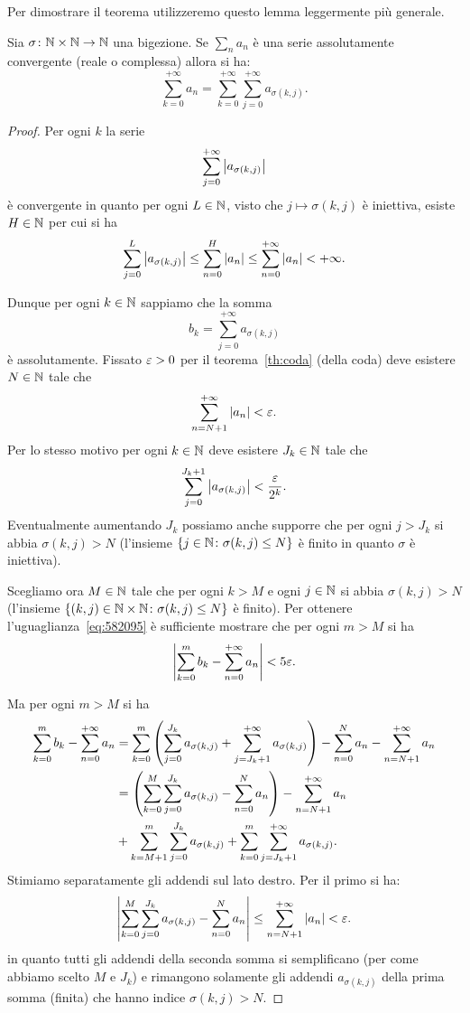 Per dimostrare il teorema utilizzeremo questo
lemma leggermente più generale.

\begin{lemma}
Sia $\sigma\colon \mathbb N\times\mathbb N\to \mathbb N$ una bigezione.
Se $\displaystyle\sum_n a_n$ è una serie
assolutamente convergente  (reale o complessa) allora si ha:
\begin{equation}\label{eq:582095}
  \sum_{k=0}^{+\infty} a_n
  = \sum_{k=0}^{+\infty} \sum_{j=0}^{+\infty} a_{\sigma(k,j)}.
\end{equation}
\end{lemma}
%
%
\begin{proof}
Per ogni $k$ la serie
\[
  \sum_{j=0}^{+\infty} {\left|a_{\sigma(k,j)}\right|}
\]
è convergente in quanto per ogni $L\in \mathbb N$,
visto che $j \mapsto \sigma(k,j)$ è iniettiva,
esiste $H\in \mathbb N$ per cui si ha
\[
  \sum_{j=0}^L {\left|a_{\sigma(k,j)}\right|}
  \le \sum_{n=0}^{H} {\left|a_n\right|}
  \le \sum_{n=0}^{+\infty} {\left|a_n\right|} < +\infty.
\]

Dunque per ogni $k\in\mathbb N$ sappiamo che la somma
\[
  b_k = \sum_{j=0}^{+\infty} a_{\sigma(k,j)}
\]
è assolutamente.
Fissato $\varepsilon>0$ per il teorema~\ref{th:coda} (della coda)
deve esistere $N\in\mathbb N$ tale che
\[
  \sum_{n=N+1}^{+\infty} {\left|a_n\right|} < \varepsilon.
\]
Per lo stesso motivo
per ogni $k\in \mathbb N$ deve esistere $J_k\in \mathbb N$ tale che
\[
  \sum_{j=0}^{J_k+1} {\left|a_{\sigma(k,j)}\right|} < \frac{\varepsilon}{2^k}.
\]
Eventualmente aumentando $J_k$ possiamo anche supporre
che per ogni $j>J_k$ si abbia $\sigma(k,j)>N$
(l'insieme ${\left\{ j\in \mathbb N \colon \sigma(k,j)\le N \right\}}$ è finito
in quanto $\sigma$ è iniettiva).

Scegliamo ora $M\in \mathbb N$ tale che
per ogni $k>M$ e ogni $j\in \mathbb N$ si abbia $\sigma(k,j)>N$
(l'insieme ${\left\{ (k,j)\in \mathbb N\times\mathbb N \colon \sigma(k,j)\le N \right\}}$
è finito).
Per ottenere l'uguaglianza~\eqref{eq:582095} è sufficiente
mostrare che per ogni $m>M$ si ha
\begin{equation}\label{eq:93655}
  {\left|\sum_{k=0}^m b_k - \sum_{n=0}^{+\infty} a_n\right|}
  < 5 \varepsilon.
\end{equation}

Ma per ogni $m>M$ si ha
\begin{equation}\label{eq:58382}
\begin{aligned}
\sum_{k=0}^m b_k - \sum_{n=0}^{+\infty} a_n
&=\sum_{k=0}^m {\left( \sum_{j=0}^{J_k} a_{\sigma(k,j)} +
\sum_{j=J_k+1}^{+\infty} a_{\sigma(k,j)} \right)} - \sum_{n=0}^N a_n - \sum_{n=N+1}^{+\infty} a_n \\
&= {\left( \sum_{k=0}^M \sum_{j=0}^{J_k} a_{\sigma(k,j)} - \sum_{n=0}^N a_n \right)}
- \sum_{n=N+1}^{+\infty} a_n \\
\qquad &
+ \sum_{k=M+1}^{m} \sum_{j=0}^{J_k} a_{\sigma(k,j)}
+ \sum_{k=0}^{m} \sum_{j=J_k+1}^{+\infty} a_{\sigma(k,j)}.
\end{aligned}
\end{equation}
Stimiamo separatamente gli addendi sul lato destro.
Per il primo si ha:
\[
 {\left|\sum_{k=0}^M \sum_{j=0}^{J_k} a_{\sigma(k,j)} - \sum_{n=0}^N a_n\right|}
 \le \sum_{n=N+1}^{+\infty} {\left|a_n\right|} < \varepsilon.
\]
in quanto tutti gli addendi della seconda somma si semplificano
(per come abbiamo scelto $M$ e $J_k$)
e rimangono solamente gli addendi $a_{\sigma(k,j)}$
della prima somma (finita) che
hanno indice $\sigma(k,j)>N$.


\end{proof}
